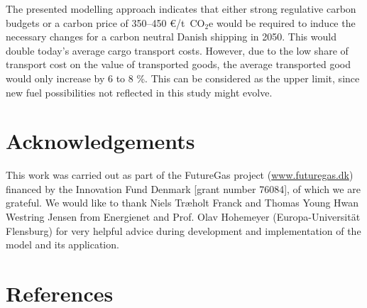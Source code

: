\documentclass[article]{elsarticle}
\begin{document}
The presented modelling approach indicates that either strong regulative carbon budgets or a carbon price of 350--450 \euro/t~CO$_2$e would be required to induce the necessary changes for a carbon neutral Danish shipping in 2050. This would double today's average cargo transport costs. However, due to the low share of transport cost on the value of transported goods, the average transported good would only increase by 6 to 8 \%. This can be considered as the upper limit, since new fuel possibilities not reflected in this study might evolve.

\section*{Acknowledgements}
This work was carried out as part of the FutureGas project (\url{www.futuregas.dk}) financed by the Innovation Fund Denmark [grant number 76084], of which we are grateful. We would like to thank Niels Tr\ae holt Franck and Thomas Young Hwan Westring Jensen from Energienet and Prof. Olav Hohemeyer (Europa-Universit\"at Flensburg) for very helpful advice during development and implementation of the model and its application.


\section*{References}


\end{document}
